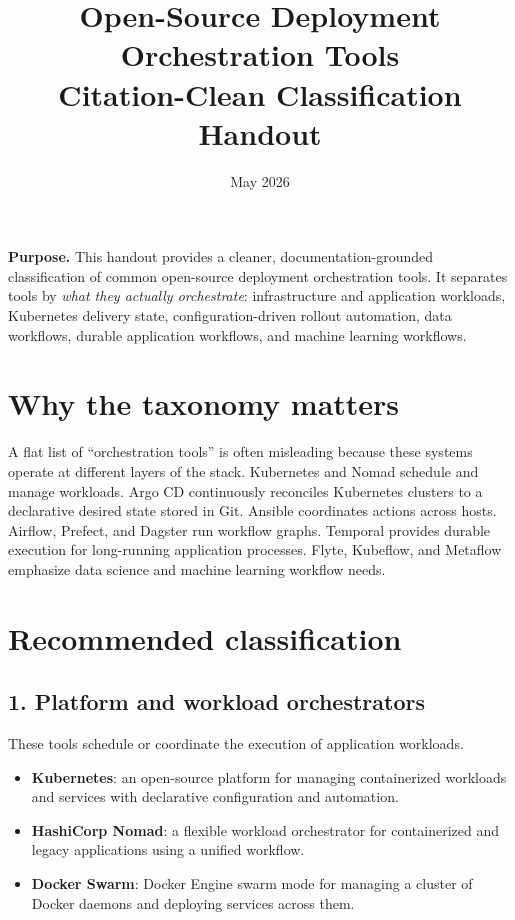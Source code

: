 \documentclass[11pt]{article}
\title{Open-Source Deployment Orchestration Tools\\\large Citation-Clean Classification Handout}
\author{}
\date{May 2026}
\begin{document}
\maketitle

\textbf{Purpose.} This handout provides a cleaner, documentation-grounded classification of common open-source deployment orchestration tools. It separates tools by \emph{what they actually orchestrate}: infrastructure and application workloads, Kubernetes delivery state, configuration-driven rollout automation, data workflows, durable application workflows, and machine learning workflows.

\section{Why the taxonomy matters}
A flat list of ``orchestration tools'' is often misleading because these systems operate at different layers of the stack. Kubernetes and Nomad schedule and manage workloads. Argo CD continuously reconciles Kubernetes clusters to a declarative desired state stored in Git. Ansible coordinates actions across hosts. Airflow, Prefect, and Dagster run workflow graphs. Temporal provides durable execution for long-running application processes. Flyte, Kubeflow, and Metaflow emphasize data science and machine learning workflow needs.\cite{KubernetesOverview,ArgoCDHome,NomadWhatIs,DockerSwarm,AnsiblePlaybooks,AirflowHome,PrefectQuickstart,DagsterOverview,TemporalWhatIs,FlyteOSS,KubeflowIntro,MetaflowWhatIs}

\section{Recommended classification}

\subsection{1. Platform and workload orchestrators}
These tools schedule or coordinate the execution of application workloads.
\begin{itemize}
    \item \textbf{Kubernetes}: an open-source platform for managing containerized workloads and services with declarative configuration and automation.\cite{KubernetesOverview}
    \item \textbf{HashiCorp Nomad}: a flexible workload orchestrator for containerized and legacy applications using a unified workflow.\cite{NomadWhatIs}
    \item \textbf{Docker Swarm}: Docker Engine swarm mode for managing a cluster of Docker daemons and deploying services across them.\cite{DockerSwarm,DockerSwarmConcepts}
\end{itemize}
\end{document}
